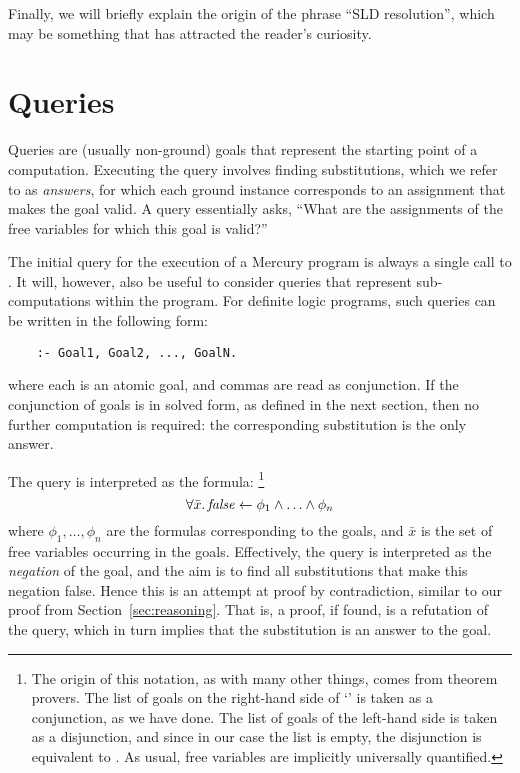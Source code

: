 Finally,
we will briefly explain the origin of the phrase ``SLD resolution'',
which may be something that has attracted the reader's curiosity.


\section{Queries}
\label{sec:queries}

Queries are (usually non-ground) goals that represent
the starting point of a computation.
Executing the query involves finding substitutions,
which we refer to as \emph{answers\label{gi:answer}},
for which each ground instance corresponds to
an assignment that makes the goal valid.
A query essentially asks,
``What are the assignments of the free variables
for which this goal is valid?''

The initial query for the
execution of a Mercury program is always
a single call to .
It will, however,
also be useful to consider queries that represent
sub-computations within the program.
For definite logic programs,
such queries can be written in the following form:
\begin{verbatim}
    :- Goal1, Goal2, ..., GoalN.
\end{verbatim}
where each  is an atomic goal,
and commas are read as conjunction.
If the conjunction of goals is in solved form,
as defined in the next section,
then no further computation is required:
the corresponding substitution is the only answer.

The query is interpreted as the formula:%
\footnote{
The origin of this notation,
as with many other things,
comes from theorem provers.
The list of goals on the right-hand side of `\co{:-}'
is taken as a conjunction,
as we have done.
The list of goals of the left-hand side
is taken as a disjunction,
and since in our case the list is empty,
the disjunction is equivalent to \false.
As usual, free variables are implicitly universally quantified.
}
\[
    \forall \bar{x}.\,
        \text{\textit{false}} \leftarrow \phi_1 \land \ldots \land \phi_n
\]
where $\phi_1, \ldots, \phi_n$
are the formulas corresponding to the goals,
and $\bar{x}$ is the set of free variables
occurring in the goals.
Effectively,
the query is interpreted as the \emph{negation} of the goal,
and the aim is to find all substitutions
that make this negation false.
Hence this is an attempt at proof by contradiction,
similar to our proof from Section~\ref{sec:reasoning}.
That is, a proof, if found, is a refutation of the query,
which in turn implies that the substitution is an answer to the goal.

